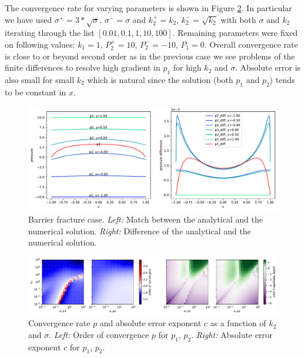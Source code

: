 \documentclass[sn-mathphys,Numbered]{sn-jnl}
\begin{document}
The convergence rate for varying parameters is shown in Figure \ref{fig:barrier_rate}. In particular we have used $\sigma^+ = 3*\sqrt{\sigma}$, $\sigma^- = \sigma$
and $k_2^+ = k_2$, $k_2^- = \sqrt{k_2}$ with both $\sigma$ and $k_2$ iterating through the list $[0.01, 0.1, 1, 10, 100]$. Remaining parameters were fixed on 
following values: $k_1=1$, $P_2^+=10$, $P_2^-=-10$, $P_1=0$. Overall convergence rate is close to or beyond second order as in the previous case we see problems 
of the finite differences to resolve high gradient in $p_1$ for high $k_2$ and $\sigma$. Absolute error is also small for small $k_2$ which is natural since the 
solution (both $p_1$ and $p_2$) tends to be constant in $x$. 

\begin{figure}
  \label{fig:barrier_solution}
  \centering
  \includegraphics[width=\textwidth, keepaspectratio=true]{figs/barrier_solution.pdf}
  \caption{Barrier fracture case.
  {\it Left:} Match between the analytical and the numerical solution. 
  {\it Right:} Difference of the analytical and the numerical solution.}
\end{figure}

\begin{figure}
  \label{fig:barrier_rate}
  \centering
  \includegraphics[width=\textwidth]{figs/barrier_conv_rate.pdf}
  \caption{Convergence rate $p$ and absolute error exponent $c$ as a function of $k_2$ and $\sigma$. 
  {\it Left:} Order of convergence $p$ for $p_1$, $p_2$.
  {\it Right:} Absolute error exponent $c$ for $p_1$, $p_2$.}
\end{figure}
\end{document}
